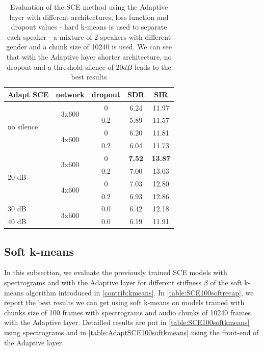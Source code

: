 \documentclass[master, tikz, final,11pt, dvipdfmx]{iscs-thesis}
\begin{document}
\begin{table}[h!]
\centering
\begin{tabular}{l|c|c|c|c}
Adapt SCE & network & dropout & SDR & SIR \\ 
\hline
\multirow{4}{*}{no silence}  & \multirow{2}{*}{3x600} & 0 & 6.24 & 11.97 \\ 
\cline{3-5}
 &  & 0.2 & 5.89 & 11.57 \\
\cline{2-5}
 & \multirow{2}{*}{4x600} & 0 & 6.20 & 11.81 \\
\cline{3-5}
 &  & 0.2 & 6.04 & 11.73 \\
\hline
\multirow{4}{*}{20 dB}  & \multirow{2}{*}{3x600} & 0 & \textbf{7.52} & \textbf{13.87} \\ 
\cline{3-5}
 &  & 0.2 & 7.00 & 13.03 \\
\cline{2-5}
 & \multirow{2}{*}{4x600} & 0 & 7.03 & 12.80 \\
\cline{3-5}
 &  & 0.2 & 6.93 & 12.86 \\
\hline
30 dB & \multirow{2}{*}{3x600} & 0.0 & 6.42 & 12.18 \\
\cline{1-1}\cline{3-5}
40 dB &  & 0.0 & 6.19 & 11.91 \\
\end{tabular}
\caption[Evaluation of the SCE method using the Adaptive layer with different architectures, loss function and dropout values]{Evaluation of the SCE method using the Adaptive layer with different architectures, loss function and dropout values - hard k-means is used to separate each speaker - a mixture of 2 speakers with different gender and a chunk size of 10240 is used. We can see that with the Adaptive layer shorter architecture, no dropout and a threshold silence of $20dB$ leads to the best results}
\label{table:AdaptSCE100drop}
\end{table}

\subsection{Soft k-means}
\label{softkmeans}

In this subsection, we evaluate the previously trained SCE models with spectrograms and with the Adaptive layer for different stiffness $\beta$ of the soft k-means algorithm introduced in \autoref{contrib:kmeans}. In \autoref{table:SCE100softrecap}, we report the best results we can get using soft k-means on models trained with chunks size of 100 frames with spectrograms and audio chunks of 10240 frames with the Adaptive layer. Detailled results are put in \autoref{table:SCE100softkmeans} using spectrograms and in \autoref{table:AdaptSCE100softkmeans} using the front-end of the Adaptive layer.
\end{document}

